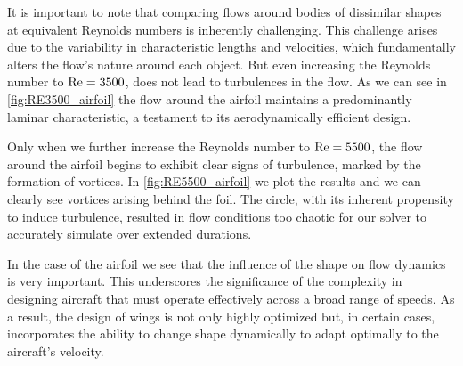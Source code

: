 It is important to note that comparing flows around bodies of dissimilar shapes at equivalent Reynolds numbers is inherently challenging. This challenge arises due to the variability in characteristic lengths and velocities, which fundamentally alters the flow's nature around each object. But even increasing the Reynolds number to $\mathrm{Re}=3500$, does not lead to turbulences in the flow. As we can see in \cref{fig:RE3500_airfoil} the flow around the airfoil maintains a predominantly laminar characteristic, a testament to its aerodynamically efficient design. 

Only when we further increase the Reynolds number to $\mathrm{Re}=5500$, the flow around the airfoil begins to exhibit clear signs of turbulence, marked by the formation of vortices. In \cref{fig:RE5500_airfoil} we plot the results and we can clearly see vortices arising behind the foil. The circle, with its inherent propensity to induce turbulence, resulted in flow conditions too chaotic for our solver to accurately simulate over extended durations. 

In the case of the airfoil we see that the influence of the shape on flow dynamics is very important. This underscores the significance of the complexity in designing aircraft that must operate effectively across a broad range of speeds. As a result, the design of wings is not only highly optimized but, in certain cases, incorporates the ability to change shape dynamically to adapt optimally to the aircraft's velocity.